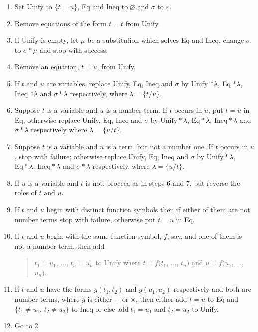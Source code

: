 \documentclass[letterpaper]{report}
\begin{document}
\begin{enumerate}
	\def\labelenumi{(\arabic{enumi})}
	\item
	Set Unify to $\{t = u\}$, Eq and Ineq to $\varnothing$ and
	$\sigma$ to $\varepsilon$.
	\item
	Remove equations of the form $t = t$ from Unify.
	\item
	If Unify is empty, let $\mu$ be a substitution which solves Eq and
	Ineq, change $\sigma$ to $\sigma*\mu$ and stop with success.
	\item
	Remove an equation, $t = u$, from Unify.
	\item
	If $t$ and $u$ are variables, replace Unify, Eq, Ineq and
	$\sigma$ by Unify $*\lambda$, Eq $*\lambda$, Ineq $*\lambda$
	and $\sigma*\lambda$ respectively, where $\lambda = \{t/u\}$.
	\item
	Suppose $t$ is a variable and $u$ is a number term. If $t$
	occurs in $u$, put $t = u$ in Eq; otherwise replace Unify, Eq,
	Ineq and $\sigma$ by $\mathrm{Unify}*\lambda$, $\mathrm{Eq}*\lambda$, $\mathrm{Ineq}*\lambda$ and $\sigma*\lambda$ respectively where
	$\lambda = \{u/t\}$.
	\item
	Suppose $t$ is a variable and $u$ is a term, but not a number one.
	If $t$ occurs in $u$, stop with failure; otherwise replace Unify,
	Eq, Ineq and $\sigma$ by $\mathrm{Unify}*\lambda$, $\mathrm{Eq}*\lambda$, $\mathrm{Ineq}*\lambda$ and $\sigma*\lambda$ respectively, where
	$\lambda = \{u/t\}$.
	\item
	If $u$ is a variable and $t$ is not, proceed as in steps 6 and 7,
	but reverse the roles of $t$ and $u$.
	\item
	If $t$ and $u$ begin with distinct function symbols then if either
	of them are not number terms stop with failure, otherwise put
	$t = u$ in Eq.
	\item
	If $t$ and $u$ begin with the same function symbol, $f$, say,
	and one of them is not a number term, then add 
	\begin{quote}
	$t_{1} = u_{1}$,
	$\ldots$, $t_{n} = u_{n}$ to Unify where $t = f(t_{1}$,
	$\ldots$, $t_{n})$ and $u = f(u_{1}$, $\ldots$, $u_{n})$.
	\end{quote}
	\item
	If $t$ and $u$ have the forms $g\left(t_{1},t_{2}\right)$ and
	$g\left(u_{1},u_{2}\right)$ respectively and both are number terms,
	where $g$ is either $+$ or $\times$, then either add $t = u$
	to Eq and $\{t_{1} \neq u_{1},\,t_{2} \neq u_{2}\}$ to Ineq or else
	add $t_{1} = u_{1}$ and $t_{2} = u_{2}$ to Unify.
	\item
	Go to 2.
\end{enumerate}
\end{document}
